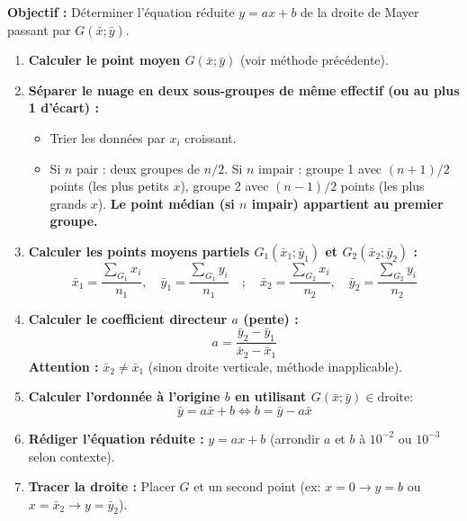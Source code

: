 \documentclass[11pt]{article}
\begin{document}
\begin{methode}
\textbf{Objectif :} Déterminer l'équation réduite $y = ax + b$ de la droite de Mayer passant par $G(\bar{x}; \bar{y})$.
\begin{enumerate}
    \item \textbf{Calculer le point moyen $G(\bar{x}; \bar{y})$} (voir méthode précédente).
    \item \textbf{Séparer le nuage en deux sous-groupes de même effectif (ou au plus 1 d'écart) :}
    \begin{itemize}
        \item Trier les données par $x_i$ croissant.
        \item Si $n$ pair : deux groupes de $n/2$. Si $n$ impair : groupe 1 avec $(n+1)/2$ points (les plus petits $x$), groupe 2 avec $(n-1)/2$ points (les plus grands $x$). \textbf{Le point médian (si $n$ impair) appartient au premier groupe.}
    \end{itemize}
    \item \textbf{Calculer les points moyens partiels $G_1(\bar{x}_1; \bar{y}_1)$ et $G_2(\bar{x}_2; \bar{y}_2)$ :}
    \[ \bar{x}_1 = \frac{\sum_{G_1} x_i}{n_1},\quad \bar{y}_1 = \frac{\sum_{G_1} y_i}{n_1} \quad ; \quad \bar{x}_2 = \frac{\sum_{G_2} x_i}{n_2},\quad \bar{y}_2 = \frac{\sum_{G_2} y_i}{n_2} \]
    \item \textbf{Calculer le coefficient directeur $a$ (pente) :}
    \[ a = \frac{\bar{y}_2 - \bar{y}_1}{\bar{x}_2 - \bar{x}_1} \]
    \textbf{Attention :} $\bar{x}_2 \neq \bar{x}_1$ (sinon droite verticale, méthode inapplicable).
    \item \textbf{Calculer l'ordonnée à l'origine $b$ en utilisant $G(\bar{x}; \bar{y}) \in \text{droite} :$}
    \[ \bar{y} = a\bar{x} + b \iff b = \bar{y} - a\bar{x} \]
    \item \textbf{Rédiger l'équation réduite :} $y = ax + b$ (arrondir $a$ et $b$ à $10^{-2}$ ou $10^{-3}$ selon contexte).
    \item \textbf{Tracer la droite :} Placer $G$ et un second point (ex: $x=0 \to y=b$ ou $x = \bar{x}_2 \to y = \bar{y}_2$).
\end{enumerate}
\end{methode}
\end{document}
